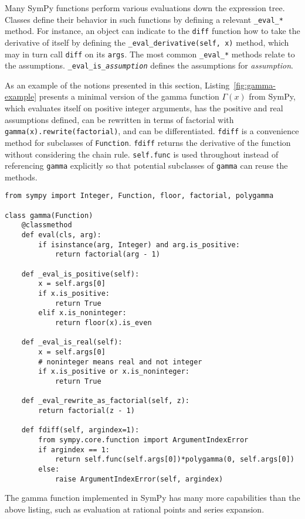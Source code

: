 Many SymPy functions perform various evaluations down the expression tree.
Classes define their behavior in such functions by defining a relevant
\verb|_eval_|\texttt{\textit{*}} method. For instance, an object can indicate
to the \texttt{diff} function how to take the derivative of itself by defining
the \verb|_eval_derivative(self, x)| method, which may in turn call
\texttt{diff} on its \texttt{args}. The most common
\verb|_eval_|\texttt{\textit{*}} methods relate to the assumptions.
\verb|_eval_is_|\texttt{\textit{assumption}} defines the assumptions for
\textit{assumption}.

As an example of the notions presented in this section,
Listing~\ref{fig:gamma-example} presents a minimal version of the gamma
function $\Gamma(x)$ from SymPy, which evaluates itself on positive integer
arguments, has the positive and real assumptions defined, can be rewritten in
terms of factorial with \verb|gamma(x).rewrite(factorial)|, and can be
differentiated. \texttt{fdiff} is a convenience method for subclasses of
\texttt{Function}. \texttt{fdiff} returns the derivative of the function
without considering the chain rule. \texttt{self.func} is used throughout
instead of referencing \texttt{gamma} explicitly so that potential subclasses
of \texttt{gamma} can reuse the methods.

\lstset{
  basicstyle=\ttfamily,
}

\begin{lstlisting}[caption={A minimal implementation of \texttt{sympy.gamma}.},label=fig:gamma-example]
from sympy import Integer, Function, floor, factorial, polygamma

class gamma(Function)
    @classmethod
    def eval(cls, arg):
        if isinstance(arg, Integer) and arg.is_positive:
            return factorial(arg - 1)

    def _eval_is_positive(self):
        x = self.args[0]
        if x.is_positive:
            return True
        elif x.is_noninteger:
            return floor(x).is_even

    def _eval_is_real(self):
        x = self.args[0]
        # noninteger means real and not integer
        if x.is_positive or x.is_noninteger:
            return True

    def _eval_rewrite_as_factorial(self, z):
        return factorial(z - 1)

    def fdiff(self, argindex=1):
        from sympy.core.function import ArgumentIndexError
        if argindex == 1:
            return self.func(self.args[0])*polygamma(0, self.args[0])
        else:
            raise ArgumentIndexError(self, argindex)
\end{lstlisting}
The gamma function implemented in SymPy has many more capabilities than the
above listing, such as evaluation at rational points and series expansion.
